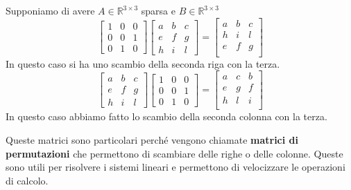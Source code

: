 Supponiamo di avere $A\in \mathbb{R}^{3\times 3}$ sparsa e $B\in \mathbb{R}^{3\times3}$
\begin{equation*}
    \left[\begin{array}{ccc}
        1 & 0 & 0 \\
        0 & 0 & 1 \\
        0 & 1 & 0
    \end{array}\right]  \left[\begin{array}{ccc}
        a & b & c \\
        e & f & g \\
        h & i & l
    \end{array}\right] = \left[\begin{array}{ccc}
        a & b & c \\
        h & i & l \\
        e & f & g \\
    \end{array}\right] 
\end{equation*}
In questo caso si ha uno scambio della seconda riga con la terza.
\begin{equation*}
     \left[\begin{array}{ccc}
        a & b & c \\
        e & f & g \\
        h & i & l
    \end{array}\right] \left[\begin{array}{ccc}
        1 & 0 & 0 \\
        0 & 0 & 1 \\
        0 & 1 & 0
    \end{array}\right] = \left[\begin{array}{ccc}
        a & c & b \\
        e & g & f \\
        h & l & i \\
    \end{array}\right] 
\end{equation*}
In questo caso abbiamo fatto lo scambio della seconda colonna con la terza.

Queste matrici sono particolari perché vengono chiamate \textbf{matrici di permutazioni}
che permettono di scambiare delle righe o delle colonne. Queste sono utili per 
risolvere i sistemi lineari e permettono di velocizzare le operazioni di calcolo. 

